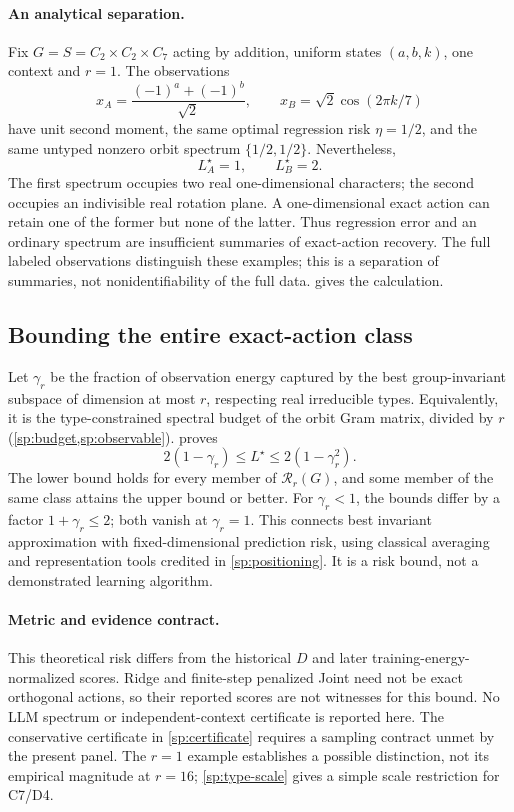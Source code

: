 \documentclass{article}
\begin{document}
\paragraph{An analytical separation.}
Fix $G=S=C_2\times C_2\times C_7$ acting by addition, uniform states $(a,b,k)$, one context and $r=1$. The observations
\[
 x_A=\frac{(-1)^a+(-1)^b}{\sqrt2},\qquad
 x_B=\sqrt2\cos(2\pi k/7)
\]
have unit second moment, the same optimal regression risk $\eta=1/2$, and the same untyped nonzero orbit spectrum $\{1/2,1/2\}$. Nevertheless,
\[
 \boxed{\ L_A^\star=1,\qquad L_B^\star=2.\ }
\]
The first spectrum occupies two real one-dimensional characters; the second occupies an indivisible real rotation plane. A one-dimensional exact action can retain one of the former but none of the latter. Thus regression error and an ordinary spectrum are insufficient summaries of exact-action recovery. The full labeled observations distinguish these examples; this is a separation of summaries, not nonidentifiability of the full data.  gives the calculation.

\subsection{Bounding the entire exact-action class}
Let $\gamma_r$ be the fraction of observation energy captured by the best group-invariant subspace of dimension at most $r$, respecting real irreducible types. Equivalently, it is the type-constrained spectral budget of the orbit Gram matrix, divided by $r$ (\cref{sp:budget,sp:observable}).  proves
\[
 \boxed{\ 2(1-\gamma_r)\le L^\star\le2(1-\gamma_r^2).\ }
\]
The lower bound holds for every member of $\mathcal R_r(G)$, and some member of the same class attains the upper bound or better. For $\gamma_r<1$, the bounds differ by a factor $1+\gamma_r\le2$; both vanish at $\gamma_r=1$. This connects best invariant approximation with fixed-dimensional prediction risk, using classical averaging and representation tools credited in \cref{sp:positioning}. It is a risk bound, not a demonstrated learning algorithm.

\paragraph{Metric and evidence contract.}
This theoretical risk differs from the historical $D$ and later training-energy-normalized scores. Ridge and finite-step penalized Joint need not be exact orthogonal actions, so their reported scores are not witnesses for this bound. No LLM spectrum or independent-context certificate is reported here. The conservative certificate in \cref{sp:certificate} requires a sampling contract unmet by the present panel. The $r=1$ example establishes a possible distinction, not its empirical magnitude at $r=16$; \cref{sp:type-scale} gives a simple scale restriction for C7/D4.
\end{document}
